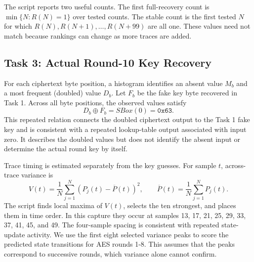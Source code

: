 \documentclass[conference,10pt,letterpaper]{IEEEtran}
\begin{document}
The script reports two useful counts. The first full-recovery count is $\min\{N:R(N)=1\}$ over tested counts. The stable count is the first tested $N$ for which $R(N),R(N+1),\ldots,R(N+99)$ are all one. These values need not match because rankings can change as more traces are added.

\subsection{Task 3: Actual Round-10 Key Recovery}
For each ciphertext byte position, a histogram identifies an absent value $M_b$ and a most frequent (doubled) value $D_b$. Let $F_b$ be the fake key byte recovered in Task 1. Across all byte positions, the observed values satisfy
\begin{equation}
D_b\oplus F_b=SBox(0)=\texttt{0x63}.
\label{eq:doubled-fake-relation}
\end{equation}
This repeated relation connects the doubled ciphertext output to the Task 1 fake key and is consistent with a repeated lookup-table output associated with input zero. It describes the doubled values but does not identify the absent input or determine the actual round key by itself.

Trace timing is estimated separately from the key guesses. For sample $t$, across-trace variance is
\begin{equation}
V(t)=\frac{1}{N}\sum_{j=1}^{N}\left(P_j(t)-\overline{P}(t)\right)^2,
\qquad
\overline{P}(t)=\frac{1}{N}\sum_{j=1}^{N}P_j(t).
\label{eq:variance}
\end{equation}
The script finds local maxima of $V(t)$, selects the ten strongest, and places them in time order. In this capture they occur at samples 13, 17, 21, 25, 29, 33, 37, 41, 45, and 49. The four-sample spacing is consistent with repeated state-update activity. We use the first eight selected variance peaks to score the predicted state transitions for AES rounds 1-8. This assumes that the peaks correspond to successive rounds, which variance alone cannot confirm.
\end{document}

